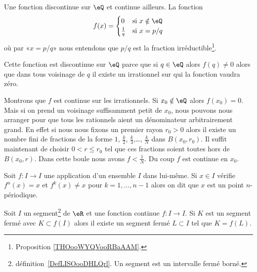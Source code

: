 \begin{example}
	Une fonction discontinue sur \( \eQ\) et continue ailleurs. La fonction
	\begin{equation}
		f(x)=\begin{cases}
			0             & \text{si } x\notin \eQ \\
			\frac{1}{ q } & \text{si } x=p/q
		\end{cases}
	\end{equation}
	où par «\( x=p/q\)» nous entendons que \( p/q\) est la fraction irréductible\footnote{Proposition \ref{THOooWYQVooRBaAAM}.}.

	Cette fonction est discontinue sur \( \eQ\) parce que si \( q\in \eQ\) alors \( f(q)\neq 0\) alors que dans tous voisinage de \( q\) il existe un irrationnel sur qui la fonction vaudra zéro.

	Montrons que \( f\) est continue sur les irrationnels. Si \( x_0\notin \eQ\) alors \( f(x_0)=0\). Mais si on prend un voisinage suffisamment petit de \( x_0\), nous pouvons nous arranger pour que tous les rationnels aient un dénominateur arbitrairement grand. En effet si nous nous fixons un premier rayon \( r_0>0\) alors il existe un nombre fini de fractions de la forme \( 1\), \( \frac{ k }{2}\), \( \frac{ k }{ 3 }\),\ldots, \( \frac{ k }{ N }\) dans \( B(x_0,r_0)\). Il suffit maintenant de choisir \( 0<r\leq r_0\) tel que ces fractions soient toutes hors de \( B(x_0,r)\). Dans cette boule nous avons \( f<\frac{1}{ N }\). Du coup \( f\) est continue en \( x_0\).
\end{example}

\begin{definition}
	Soit \( f\colon I\to I\) une application d'un ensemble \( I\) dans lui-même. Si \( x\in I\) vérifie \( f^n(x)=x\) et \( f^k(x)\neq x\) pour \( k=1,\ldots, n-1\) alors on dit que \( x\) est un point \( n\)-périodique.
\end{definition}

\begin{lemma}       \label{LemAONBooGZBuYt}
	Soit \( I\) un segment\footnote{définition~\ref{DefLISOooDHLQrl}. Un segment est un intervalle fermé borné.} de \( \eR\) et une fonction continue \( f\colon I\to I\). Si \( K\) est un segment fermé avec \( K\subset f(I)\) alors il existe un segment fermé \( L\subset I\) tel que \( K=f(L)\).
\end{lemma}


